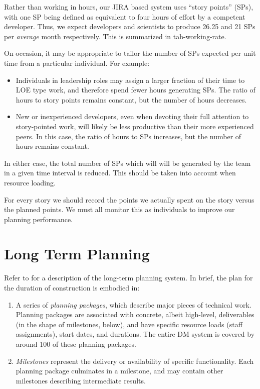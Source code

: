 Rather than working in hours, our JIRA based system uses ``story
points'' (SPs), with one SP being defined as equivalent to four hours of
effort by a competent developer. Thus, we expect developers and
scientists to produce 26.25 and 21 SPs per \emph{average} month
respectively. This is summarized in tab-working-rate.

On occasion, it may be appropriate to tailor the number of SPs expected
per unit time from a particular individual. For example:

\begin{itemize}
\item
  Individuals in leadership roles may assign a larger fraction of their
  time to LOE type work, and therefore spend fewer hours generating SPs.
  The ratio of hours to story points remains constant, but the number of
  hours decreases.
\item
  New or inexperienced developers, even when devoting their full
  attention to story-pointed work, will likely be less productive than
  their more experienced peers. In this case, the ratio of hours to SPs
  increases, but the number of hours remains constant.
\end{itemize}

In either case, the total number of SPs which will will be generated by
the team in a given time interval is reduced. This should be taken into
account when resource loading.

For every story we should record the points we actually spent on the
story versus the planned points. We must all monitor this as individuals
to improve our planning performance.

\section{Long Term Planning}
\label{sec:long-term-plan}

Refer to  for a description of the long-term planning system.
In brief, the plan for the duration of construction is embodied in:

\begin{enumerate}
\item
  A series of \emph{planning packages}, which describe major pieces of
  technical work. Planning packages are associated with concrete, albeit
  high-level, deliverables (in the shape of milestones, below), and have
  specific resource loads (staff assignments), start dates, and
  durations. The entire DM system is covered by around 100 of these
  planning packages.
\item
  \emph{Milestones} represent the delivery or availability of specific
  functionality. Each planning package culminates in a milestone, and
  may contain other milestones describing intermediate results.
\end{enumerate}

